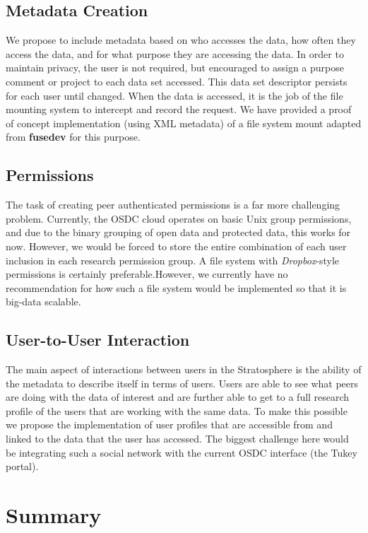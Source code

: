 \begin{multicols*}{2}
{\subsection{Metadata Creation}

We propose to include metadata based on who accesses the data, how
often they access the data, and for what purpose they are accessing
the data.  In order to maintain privacy, the user is not required, but
encouraged to assign a purpose comment or project to each data set
accessed. This data set descriptor persists for each user until
changed.  When the data is accessed, it is the job of the file
mounting system to intercept and record the request.  We have provided
a proof of concept implementation (using XML metadata) of a file
system mount adapted from \textbf{fusedev} for this purpose.

\subsection{Permissions}

The task of creating peer authenticated permissions is a far more
challenging problem. Currently, the OSDC cloud operates on basic Unix
group permissions, and due to the binary grouping of open data and
protected data, this works for now. However, we would be forced to
store the entire combination of each user inclusion in each research
permission group. A file system with \textit{Dropbox}-style
permissions is certainly preferable.However, we currently have no
recommendation for how such a file system would be implemented so that
it is big-data scalable.

\subsection{User-to-User Interaction}

The main aspect of interactions between users in the Stratosphere is
the ability of the metadata to describe itself in terms of
users. Users are able to see what peers are doing with the data of
interest and are further able to get to a full research profile of the
users that are working with the same data. To make this possible we
propose the implementation of user profiles that are accessible from
and linked to the data that the user has accessed. The biggest
challenge here would be integrating such a social network with the
current OSDC interface (the Tukey portal).

\section{Summary}
\label{sec:summary}

}
\end{multicols*}
